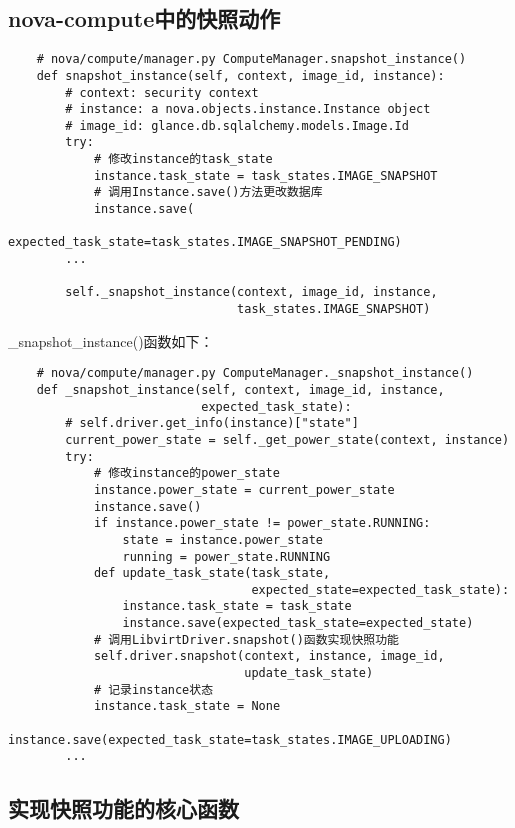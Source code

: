 \documentclass[a4paper,left=1.5cm,right=1.5cm,11pt]{article}
\begin{document}
\subsection{nova-compute中的快照动作}
    \begin{lstlisting}
    # nova/compute/manager.py ComputeManager.snapshot_instance()
    def snapshot_instance(self, context, image_id, instance):
        # context: security context
        # instance: a nova.objects.instance.Instance object
        # image_id: glance.db.sqlalchemy.models.Image.Id
        try:
            # 修改instance的task_state
            instance.task_state = task_states.IMAGE_SNAPSHOT
            # 调用Instance.save()方法更改数据库
            instance.save(
                        expected_task_state=task_states.IMAGE_SNAPSHOT_PENDING)
        ...

        self._snapshot_instance(context, image_id, instance,
                                task_states.IMAGE_SNAPSHOT)
    \end{lstlisting}

    \_snapshot\_instance()函数如下：

    \begin{lstlisting}
    # nova/compute/manager.py ComputeManager._snapshot_instance()
    def _snapshot_instance(self, context, image_id, instance,
                           expected_task_state):
        # self.driver.get_info(instance)["state"]
        current_power_state = self._get_power_state(context, instance)
        try:
            # 修改instance的power_state
            instance.power_state = current_power_state
            instance.save()
            if instance.power_state != power_state.RUNNING:
                state = instance.power_state
                running = power_state.RUNNING
            def update_task_state(task_state,
                                  expected_state=expected_task_state):
                instance.task_state = task_state
                instance.save(expected_task_state=expected_state)
            # 调用LibvirtDriver.snapshot()函数实现快照功能
            self.driver.snapshot(context, instance, image_id,
                                 update_task_state)
            # 记录instance状态
            instance.task_state = None
            instance.save(expected_task_state=task_states.IMAGE_UPLOADING)
        ...
    \end{lstlisting}

\clearpage

\subsection{实现快照功能的核心函数}
\end{document}
